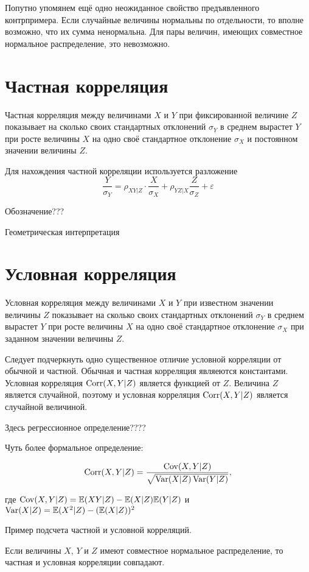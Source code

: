 \documentclass[10pt]{article}
\begin{document}
Попутно упомянем ещё одно неожиданное свойство предъявленного контрпримера. Если случайные величины нормальны по отдельности, то вполне возможно, что их сумма ненормальна. Для пары величин, имеющих совместное нормальное распределение, это невозможно.


\section{Частная корреляция}

\begin{definition}
Частная корреляция между величинами $X$ и $Y$ при фиксированной величине $Z$ показывает на сколько своих стандартных отклонений $\sigma_Y$ в среднем вырастет $Y$ при росте величины $X$ на одно своё стандартное отклонение $\sigma_X$ и постоянном значении величины $Z$.
\end{definition}

Для нахождения частной корреляции используется разложение
\[
\frac{Y}{\sigma_Y}=\rho_{XY|Z} \cdot \frac{X}{\sigma_X} + \rho_{YZ|X} \frac{Z}{\sigma_Z} + \varepsilon
\]


Обозначение???

Геометрическая интерпретация

\section{Условная корреляция}

\begin{definition}
Условная корреляция между величинами $X$ и $Y$ при известном значении величины $Z$ показывает на сколько своих стандартных отклонений $\sigma_Y$ в среднем вырастет $Y$ при росте величины $X$ на одно своё стандартное отклонение $\sigma_X$ при заданном значении величины $Z$.
\end{definition}


Следует подчеркнуть одно существенное отличие условной корреляции от обычной и частной. Обычная и частная корреляция являеются константами. Условная корреляция $\operatorname{Corr}(X,Y|Z)$ является функцией от $Z$. Величина $Z$ является случайной, поэтому и условная корреляция $\operatorname{Corr}(X,Y|Z)$ является случайной величиной. 

Здесь регрессионное определение???? 

Чуть более формальное определение:

\begin{definition}
\[
\operatorname{Corr}(X,Y|Z) = \frac{\operatorname{Cov}(X,Y|Z)}{\sqrt{\operatorname{Var}(X|Z)\operatorname{Var}(Y|Z)}},
\]
\end{definition}

где $\operatorname{Cov}(X,Y|Z)=\mathbb{E}(XY|Z)-\mathbb{E}(X|Z)\mathbb{E}(Y|Z)$ и $\operatorname{Var}(X|Z)=\mathbb{E}(X^2|Z)-(\mathbb{E}(X|Z))^2$


Пример подсчета частной и условной корреляций.

\begin{theorem}
Если величины $X$, $Y$ и $Z$ имеют совместное нормальное распределение, то частная и условная корреляции совпадают.
\end{theorem}
\end{document}
